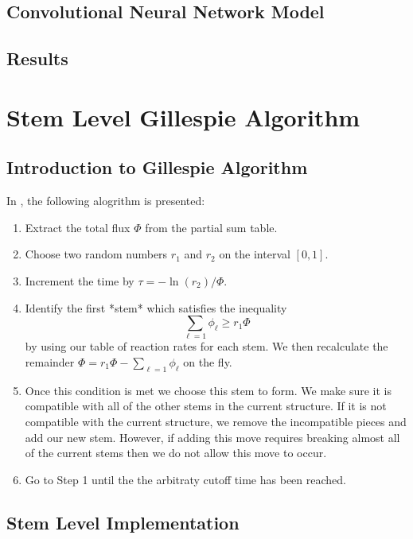 \documentclass[11pt]{article}
\begin{document}
\subsection{Convolutional Neural Network Model}
\lipsum[2]
\subsection{Results}
\lipsum[2]
\section{Stem Level Gillespie Algorithm}
\subsection{Introduction to Gillespie Algorithm}
In \cite{10.1093/nar/gkv480}, the following alogrithm is presented:
\begin{enumerate}
\item Extract the total flux $\Phi$ from the partial sum table.
\item Choose two random numbers $r_{1}$ and $r_{2}$ on the interval $[0, 1]$.
\item  Increment the time by $\tau = - \ln(r_{2})/\Phi$.
\item Identify the first *stem* which satisfies the inequality $$ \sum_{\ell =1} \phi_{\ell} \geq r_{1} \Phi$$ by using our table of reaction rates for each stem. We then recalculate the remainder $\Phi = r_{1} \Phi - \sum_{\ell = 1} \phi_{\ell}$ on the fly.
\item Once this condition is met we choose this stem to form. We make sure it is compatible with all of the other stems in the current structure. If it is not compatible with the current structure, we remove the incompatible pieces and add our new stem. However, if adding this move requires breaking almost all of the current stems then we do not allow this move to occur.
\item Go to Step 1 until the the arbitraty cutoff time has been reached.
\end{enumerate}

\subsection{Stem Level Implementation}
\end{document}
